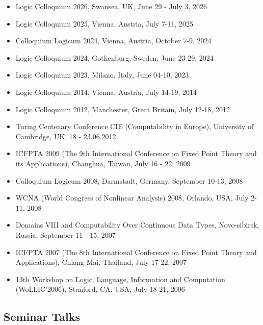 \documentclass[12pt]{article}
\begin{document}
\begin{itemize}

\item Logic Colloquium 2026, Swansea, UK, June 29 - July 3, 2026

\item Logic Colloquium 2025, Vienna, Austria,  July 7-11, 2025

\item Colloquium Logicum 2024, Vienna, Austria, October 7-9, 2024

\item Logic Colloquium 2024, Gothenburg,  Sweden, June 23-29, 2024

\item Logic Colloquium 2023, Milano,  Italy, June 04-10, 2023

\item Logic Colloquium 2014, Vienna, Austria, July 14-19, 2014

\item Logic Colloquium 2012, Manchester, Great Britain, July 12-18, 2012

\item Turing Centenary Conference CIE (Computability in Europe), University of Cambridge, UK, 18 - 23.06.2012

\item ICFPTA 2009 (The 9th International Conference on Fixed Point Theory and its Applications), Changhua, Taiwan, July 16 - 22, 2009

\item Colloquium Logicum 2008, Darmstadt, Germany, September 10-13, 2008

\item WCNA (World Congress of Nonlinear Analysis) 2008, Orlando, USA, July 2-11, 2008

\item Domains VIII and  Computability Over Continuous Data Types, Novo-sibirsk, Russia, September 11 - 15, 2007

\item ICFPTA 2007 (The 8th International Conference on Fixed Point Theory and Applications), Chiang Mai, Thailand, July 17-22, 2007

\item  13th Workshop on Logic, Language, Information and Computation (WoLLIC'2006), Stanford, CA, 
 USA, July 18-21, 2006
 
\end{itemize}


\subsection*{ Seminar Talks}
\end{document}
